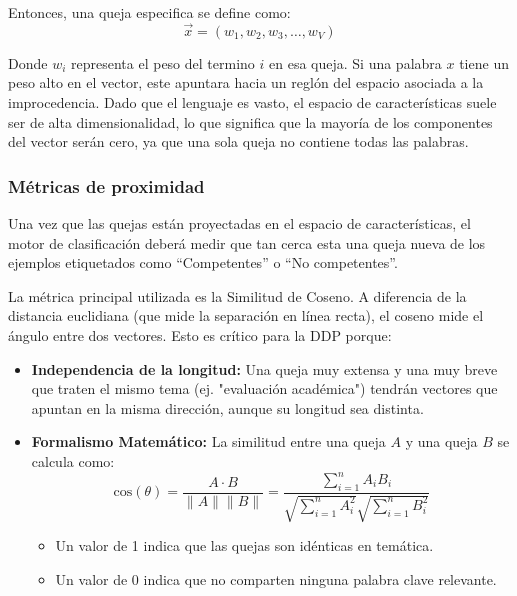 Entonces, una queja especifica se define como:
\begin{equation}
\vec{x} = (w_1, w_2, w_3, \dots, w_V)
\end{equation}

Donde $w_i$ representa el peso del termino $i$ en esa queja. Si una palabra $x$ tiene un peso alto en el vector, este apuntara hacia un reglón del espacio asociada a la improcedencia. Dado que el lenguaje es vasto, el espacio de características suele ser de alta dimensionalidad, lo que significa que la mayoría de los componentes del vector serán cero, ya que una sola queja no contiene todas las palabras.

\subsubsection{Métricas de proximidad}

Una vez que las quejas están proyectadas en el espacio de características, el motor de clasificación deberá medir que tan cerca esta una queja nueva de los ejemplos etiquetados como “Competentes” o “No competentes”.

La métrica principal utilizada es la Similitud de Coseno. A diferencia de la distancia euclidiana (que mide la separación en línea recta), el coseno mide el ángulo entre dos vectores. Esto es crítico para la DDP porque:

\begin{itemize}
    \item \textbf{Independencia de la longitud:} Una queja muy extensa y una muy breve que traten el mismo tema (ej. "evaluación académica") tendrán vectores que apuntan en la misma dirección, aunque su longitud sea distinta.
    \item \textbf{Formalismo Matemático:} La similitud entre una queja $A$ y una queja $B$ se calcula como:
    \begin{equation}
    \text{cos}(\theta) = \frac{A \cdot B}{\|A\| \|B\|} = \frac{\sum_{i=1}^{n} A_i B_i}{\sqrt{\sum_{i=1}^{n} A_i^2} \sqrt{\sum_{i=1}^{n} B_i^2}}
    \end{equation}
    \begin{itemize}
        \item Un valor de 1 indica que las quejas son idénticas en temática.
        \item Un valor de 0 indica que no comparten ninguna palabra clave relevante.
    \end{itemize}
\end{itemize}

